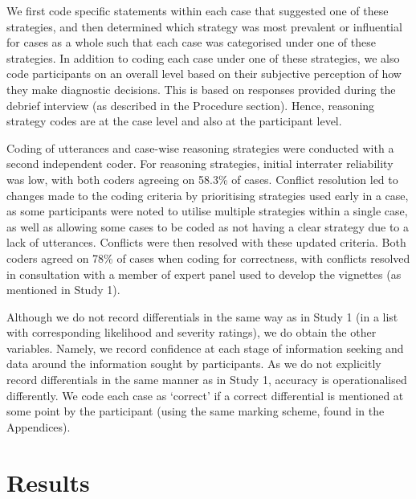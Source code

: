 \documentclass[a4paper, nobind]{templates/ociamthesis}
\begin{document}
We first code specific statements within each case that suggested one of these strategies, and then determined which strategy was most prevalent or influential for cases as a whole such that each case was categorised under one of these strategies. In addition to coding each case under one of these strategies, we also code participants on an overall level based on their subjective perception of how they make diagnostic decisions. This is based on responses provided during the debrief interview (as described in the Procedure section). Hence, reasoning strategy codes are at the case level and also at the participant level.

Coding of utterances and case-wise reasoning strategies were conducted with a second independent coder. For reasoning strategies, initial interrater reliability was low, with both coders agreeing on 58.3\% of cases. Conflict resolution led to changes made to the coding criteria by prioritising strategies used early in a case, as some participants were noted to utilise multiple strategies within a single case, as well as allowing some cases to be coded as not having a clear strategy due to a lack of utterances. Conflicts were then resolved with these updated criteria. Both coders agreed on 78\% of cases when coding for correctness, with conflicts resolved in consultation with a member of expert panel used to develop the vignettes (as mentioned in Study 1).

Although we do not record differentials in the same way as in Study 1 (in a list with corresponding likelihood and severity ratings), we do obtain the other variables. Namely, we record confidence at each stage of information seeking and data around the information sought by participants. As we do not explicitly record differentials in the same manner as in Study 1, accuracy is operationalised differently. We code each case as `correct' if a correct differential is mentioned at some point by the participant (using the same marking scheme, found in the Appendices).

\section*{Results}\label{results-1}
\end{document}

